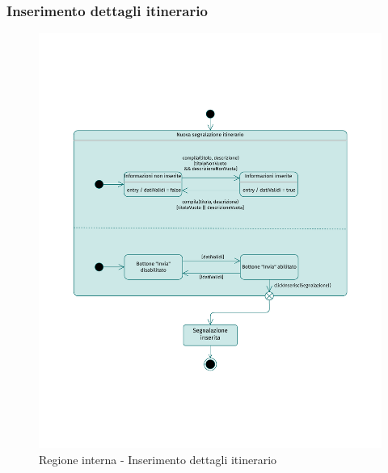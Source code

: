 \documentclass{natourDoc}
\begin{document}
\subsubsection{Inserimento dettagli itinerario}
\begin{figure}[!htbp]
	\centering
	\includegraphics[width=\textwidth, page=3]{./diagrams/statechart.pdf}
	\caption{Regione interna - Inserimento dettagli itinerario}
\end{figure}
\FloatBarrier

\newpage
\end{document}
